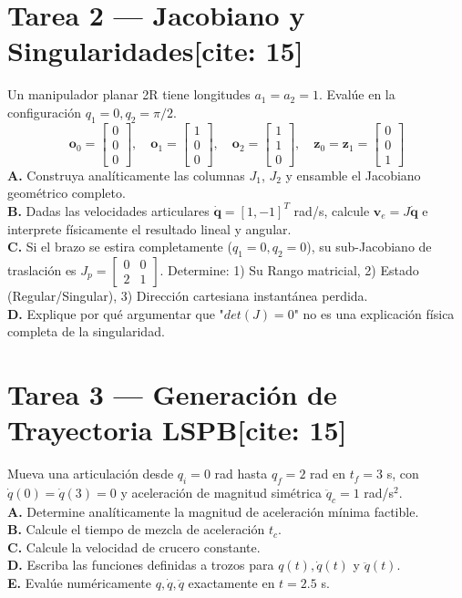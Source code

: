 \documentclass[11pt, a4paper]{article}
\begin{document}
\section*{Tarea 2 — Jacobiano y Singularidades[cite: 15]}
Un manipulador planar 2R tiene longitudes $a_1=a_2=1$. Evalúe en la configuración $q_1=0, q_2=\pi/2$. 
\begin{equation*}
    \mathbf{o}_0 = \begin{bmatrix} 0 \\ 0 \\ 0 \end{bmatrix}, \quad \mathbf{o}_1 = \begin{bmatrix} 1 \\ 0 \\ 0 \end{bmatrix}, \quad \mathbf{o}_2 = \begin{bmatrix} 1 \\ 1 \\ 0 \end{bmatrix}, \quad \mathbf{z}_0 = \mathbf{z}_1 = \begin{bmatrix} 0 \\ 0 \\ 1 \end{bmatrix}
\end{equation*}
\textbf{A.} Construya analíticamente las columnas $J_1$, $J_2$ y ensamble el Jacobiano geométrico completo.\\
\textbf{B.} Dadas las velocidades articulares $\dot{\mathbf{q}} = [1, -1]^T$ rad/s, calcule $\mathbf{v}_e = J\dot{\mathbf{q}}$ e interprete físicamente el resultado lineal y angular.\\
\textbf{C.} Si el brazo se estira completamente ($q_1=0, q_2=0$), su sub-Jacobiano de traslación es $J_p = \begin{bmatrix} 0 & 0 \\ 2 & 1 \end{bmatrix}$. Determine: 1) Su Rango matricial, 2) Estado (Regular/Singular), 3) Dirección cartesiana instantánea perdida.\\
\textbf{D.} Explique por qué argumentar que "$det(J) = 0$" no es una explicación física completa de la singularidad.

\section*{Tarea 3 — Generación de Trayectoria LSPB[cite: 15]}
Mueva una articulación desde $q_i=0$ rad hasta $q_f=2$ rad en $t_f=3$ s, con $\dot{q}(0)=\dot{q}(3)=0$ y aceleración de magnitud simétrica $\ddot{q}_c = 1$ rad/s$^2$. \\
\textbf{A.} Determine analíticamente la magnitud de aceleración mínima factible.\\
\textbf{B.} Calcule el tiempo de mezcla de aceleración $t_c$.\\
\textbf{C.} Calcule la velocidad de crucero constante.\\
\textbf{D.} Escriba las funciones definidas a trozos para $q(t), \dot{q}(t)$ y $\ddot{q}(t)$.\\
\textbf{E.} Evalúe numéricamente $q, \dot{q}, \ddot{q}$ exactamente en $t = 2.5$ s.
\end{document}
